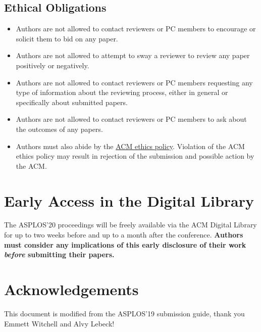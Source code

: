 \documentclass[pageno]{jpaper}
\begin{document}
\subsection{Ethical Obligations}
\begin{itemize}
\item Authors are not allowed to contact reviewers or PC members to encourage or solicit them to bid on any paper.
\item Authors are not allowed to attempt to sway a reviewer to review any paper positively or negatively.
\item Authors are not allowed to contact reviewers or PC members requesting any type of information about the reviewing process, either in general or specifically about submitted papers.
\item Authors are not allowed to contact reviewers or PC members to ask about the outcomes of any papers.
\item Authors must also abide by the \href{https://www.acm.org/code-of-ethics}{ACM ethics policy}. Violation of the ACM ethics policy may result in rejection of the submission and possible action by the ACM.
\end{itemize}
\section{Early Access in the Digital Library}

The ASPLOS'20 proceedings will be freely available via the ACM Digital
Library for up to two weeks before and up to a month after the
conference. {\bf Authors must consider any implications of this early
disclosure of their work {\em before} submitting their papers.}


\section{Acknowledgements}

This document is modified from the ASPLOS'19 submission guide, thank you Emmett Witchell and Alvy Lebeck!



\end{document}
